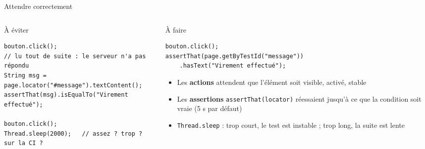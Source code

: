 \documentclass[aspectratio=169,10pt]{beamer}
\begin{document}
\begin{frame}[fragile]{Attendre correctement}
  \begin{columns}[T]
    \begin{column}{0.5\textwidth}
      \begin{alertblock}{À éviter}
\begin{lstlisting}[basicstyle=\lstcode\scriptsize]
bouton.click();
// lu tout de suite : le serveur n'a pas répondu
String msg = page.locator("#message").textContent();
assertThat(msg).isEqualTo("Virement effectué");

bouton.click();
Thread.sleep(2000);   // assez ? trop ? sur la CI ?
\end{lstlisting}
      \end{alertblock}
    \end{column}
    \begin{column}{0.46\textwidth}
      \begin{exampleblock}{À faire}
\begin{lstlisting}[basicstyle=\lstcode\scriptsize]
bouton.click();
assertThat(page.getByTestId("message"))
    .hasText("Virement effectué");
\end{lstlisting}
      \end{exampleblock}
      \small
      \begin{itemize}
        \item Les \textbf{actions} attendent que l'élément soit visible, activé, stable
        \item Les \textbf{assertions} \texttt{assertThat(locator)} réessaient jusqu'à ce que la condition soit vraie (5 s par défaut)
        \item \texttt{Thread.sleep} : trop court, le test est instable ; trop long, la suite est lente
      \end{itemize}
    \end{column}
  \end{columns}
\end{frame}
\end{document}
